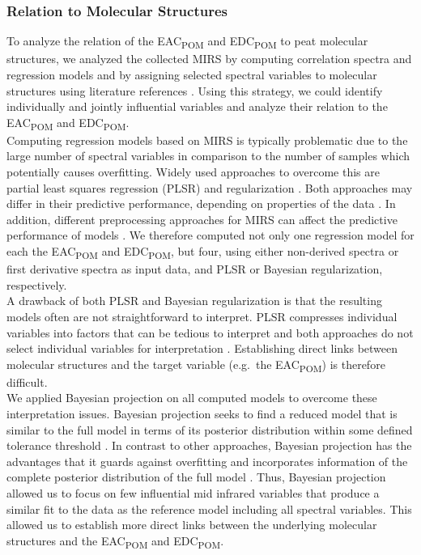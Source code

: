 \documentclass[alpha-refs]{wiley-article-rmd}
\begin{document}
\begin{refsection}
\hypertarget{relation-to-molecular-structures}{%
\subsubsection{Relation to Molecular Structures}\label{relation-to-molecular-structures}}

To analyze the relation of the EAC\textsubscript{POM} and EDC\textsubscript{POM} to peat molecular structures, we analyzed the collected MIRS by computing correlation spectra and regression models and by assigning selected spectral variables to molecular structures using literature references \autocite{Cocozza.2003,Stuart.2005,Kubo.2005,Schmidt.2006,Artz.2008}. Using this strategy, we could identify individually and jointly influential variables and analyze their relation to the EAC\textsubscript{POM} and EDC\textsubscript{POM}.\\
Computing regression models based on MIRS is typically problematic due to the large number of spectral variables in comparison to the number of samples which potentially causes overfitting. Widely used approaches to overcome this are partial least squares regression (PLSR) and regularization \autocites[e.g.~][]{Artz.2008}{Ferragina.2015}. Both approaches may differ in their predictive performance, depending on properties of the data \autocite{Ferragina.2015}. In addition, different preprocessing approaches for MIRS can affect the predictive performance of models \autocite{Engel.2013}. We therefore computed not only one regression model for each the EAC\textsubscript{POM} and EDC\textsubscript{POM}, but four, using either non-derived spectra or first derivative spectra as input data, and PLSR or Bayesian regularization, respectively.\\
A drawback of both PLSR and Bayesian regularization is that the resulting models often are not straightforward to interpret. PLSR compresses individual variables into factors that can be tedious to interpret and both approaches do not select individual variables for interpretation \autocite{Yun.2019,Piironen.2020}. Establishing direct links between molecular structures and the target variable (e.g.~the EAC\textsubscript{POM}) is therefore difficult.\\
We applied Bayesian projection \autocite{Piironen.2020} on all computed models to overcome these interpretation issues. Bayesian projection seeks to find a reduced model that is similar to the full model in terms of its posterior distribution within some defined tolerance threshold \autocite{Piironen.2020}. In contrast to other approaches, Bayesian projection has the advantages that it guards against overfitting and incorporates information of the complete posterior distribution of the full model \autocite{Piironen.2017,Piironen.2020}. Thus, Bayesian projection allowed us to focus on few influential mid infrared variables that produce a similar fit to the data as the reference model including all spectral variables. This allowed us to establish more direct links between the underlying molecular structures and the EAC\textsubscript{POM} and EDC\textsubscript{POM}.\\

\end{refsection}
\end{document}
